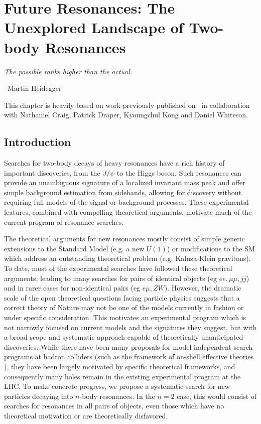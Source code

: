 \chapter{Future Resonances: The Unexplored Landscape of Two-body Resonances}
\label{chapter:topo}


\epigraph{\textit{The possible ranks higher than the actual.}}{--Martin Heidegger}

This chapter is heavily based on work previously published on~\cite{craig2016unexplored} in collaboration with Nathaniel Craig, Patrick Draper, Kyoungchul Kong and Daniel Whiteson.


\newcommand{\none}{\emptyset}
\newcommand{\bnum}[2]{(\mathbf{#1}, #2)}
\newcommand{\fnum}[2]{[\mathbf{#1}, #2]}

\section{Introduction}

Searches for two-body decays of heavy resonances have a rich history of important discoveries, from the $J/\psi$ to the Higgs boson.  Such resonances can provide an unambiguous signature of a localized invariant mass peak and offer simple background estimation from sidebands, allowing for discovery without requiring full models of the signal or background processes.  These experimental features, combined with compelling theoretical arguments, motivate much of the current program of resonance searches.

The theoretical arguments for new resonances mostly consist of simple generic extensions to the Standard Model (e.g. a new $U(1)$) or modifications to the SM which address an outstanding theoretical problem (e.g. Kaluza-Klein gravitons).  To date, most of the experimental searches have followed these theoretical arguments, leading to many searches for pairs of identical objects (eg $ee,\mu\mu, jj$) and in rarer cases for non-identical pairs (eg $e\mu,ZW$).   However,  the dramatic scale of the open theoretical  questions facing particle physics suggests that a correct theory of Nature may not be one of the models currently in fashion or under specific consideration.   This motivates an experimental program which is not narrowly focused on current models and the signatures they suggest, but with a broad scope and systematic approach capable of theoretically unanticipated discoveries. While there have been many proposals for model-independent search programs at hadron colliders (such as the framework of on-shell effective theories \cite{ArkaniHamed:2007fw}), they have been largely motivated by specific theoretical frameworks, and consequently many holes remain in the existing experimental program at the LHC. To make concrete progress, we propose a systematic search for new particles decaying into $n$-body resonances. In the $n=2$ case, this would consist of searches for resonances in all pairs of objects, even those which have no theoretical motivation or are theoretically disfavored.

